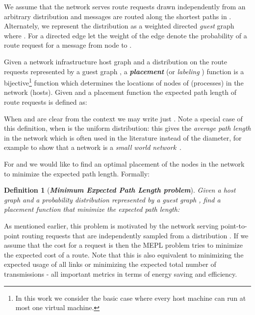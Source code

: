 \documentclass[conference]{IEEEtran}
\newtheorem{definition}{Definition}
\begin{document}
We assume that the network serves route requests drawn independently from an arbitrary distribution  and messages are routed along the shortest paths in . 
Alternately, we represent the distribution  as a weighted directed \emph{guest} graph  where .
For a directed edge  let the weight of the edge  denote the probability of a route request for a message
from node  to .









Given a network infrastructure host graph  and a distribution on the route requests represented by a guest graph ,
 a {\bf \emph{placement}} (or \emph{labeling} \cite{chung1988labelings}) function is
a bijective\footnote{In this work we consider the basic case where every host machine can run at most one virtual machine.} function  which determines the locations of nodes of  (processes) in the network  (hosts).
Given   and a placement  function  the expected path length of route requests is defined as:


When  and  are clear from the context we may write just .
Note a special case of this definition, when  is the uniform distribution: this gives the \emph{average path length} in the network which is often used in the literature instead of the diameter, for example to show that a network is a \emph{small world network}~\cite{watts1998collective}.

For  and  we would like to find an optimal placement of the nodes in the network to minimize the expected path length. Formally:
\begin{definition}[\bf \emph{Minimum Expected Path Length problem}]
Given a host graph  and a probability distribution represented by a guest graph , find a placement function that minimize the expected path length:

\end{definition}




As mentioned earlier, this problem is motivated by the network serving point-to-point routing requests that are independently sampled from a distribution . If we assume that the cost for a request  is  then the MEPL problem tries to minimize the expected cost of a route. Note that this is also equivalent to minimizing the expected usage of all links or  minimizing the expected total number of transmissions - all important metrics in terms of energy saving and efficiency.
\end{document}
